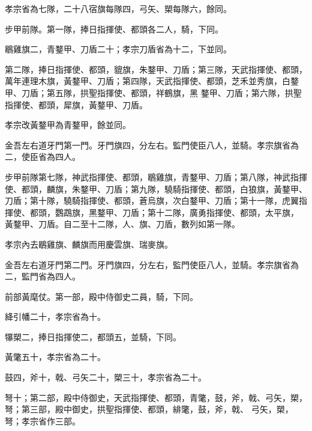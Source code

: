 \begin{pinyinscope}
 孝宗省為七隊，二十八宿旗每隊四，弓矢、槊每隊六，餘同。



 步甲前隊。第一隊，捧日指揮使、都頭各二人，騎，下同。



 鶡雞旗二，青鍪甲、刀盾二十；孝宗刀盾省為十二，下並同。



 第二隊，捧日指揮使、都頭，貔旗，朱鍪甲、刀盾；第三隊，天武指揮使、都頭，萬年連理木旗，黃鍪甲、刀盾；第四隊，天武指揮使、都頭，芝禾並秀旗，白鍪甲、刀盾；第五隊，拱聖指揮使、都頭，祥鶴旗，黑
 鍪甲、刀盾；第六隊，拱聖指揮使、都頭，犀旗，黃鍪甲、刀盾。



 孝宗改黃鍪甲為青鍪甲，餘並同。



 金吾左右道牙門第一門。牙門旗四，分左右。監門使臣八人，並騎。孝宗旗省為二，使臣省為四人。



 步甲前隊第七隊，神武指揮使、都頭，鶡雞旗，青鍪甲、刀盾；第八隊，神武指揮使、都頭，麟旗，朱鍪甲、刀盾；第九隊，驍騎指揮使、都頭，白狼旗，黃鍪甲、刀盾；第十隊，驍騎指揮使、都頭，蒼烏旗，次白鍪甲、刀盾；第十一隊，虎翼指揮使、都頭，鸚鵡旗，黑鍪甲、刀盾；第十二隊，廣勇指揮使、都頭，太平旗，
 黃鍪甲、刀盾。自二至十二隊，人、旗、刀盾，數列如第一隊。



 孝宗內去鶡雞旗、麟旗而用慶雲旗、瑞麥旗。



 金吾左右道牙門第二門。牙門旗四，分左右，監門使臣八人，並騎。孝宗旗省為二，監門省為四人。



 前部黃麾仗。第一部，殿中侍御史二員，騎，下同。



 絳引幡二十，孝宗省為十。



 犦槊二，捧日指揮使二，都頭五，並騎，下同。



 黃氅五十，孝宗省為二十。



 鼓四，斧十，戟、弓矢二十，槊三十，孝宗省為二十。



 弩十；第二部，殿中侍御史，天武指揮使、都頭，青氅，鼓，斧，戟、弓矢，槊，弩；第三部，殿中御史，拱聖指揮使、都頭，緋氅，鼓，斧，戟、
 弓矢，槊，弩；孝宗省作三部。




\end{pinyinscope}
